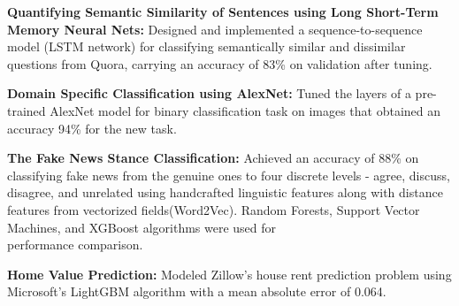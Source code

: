 \begin{cventries}
\vspace{-5mm}
  \cventry
    {}
    {}
    {}
    {}
    {
      \begin{cvitems}
      \item {{ \textbf{Quantifying Semantic Similarity of Sentences using Long Short-Term Memory Neural Nets:} Designed and implemented a sequence-to-sequence model (LSTM network) for classifying semantically similar and dissimilar questions from Quora, carrying an accuracy of 83\% on validation after tuning.}}
      \item {{\textbf{Domain Specific Classification using AlexNet:} Tuned the layers of a pre-trained AlexNet model for binary classification task on images that obtained an accuracy 94\% for the new task.}}
      \item { \textbf{The Fake News Stance Classification:} Achieved an accuracy of 88\% on classifying fake news from the genuine ones to four discrete levels - agree, discuss, disagree, and unrelated using handcrafted linguistic features along with distance features from vectorized fields(Word2Vec). Random Forests, Support Vector Machines, and XGBoost algorithms were used for \\ performance comparison.}
      \item { \textbf{Home Value Prediction:} Modeled Zillow's house rent prediction problem using Microsoft's LightGBM algorithm with a mean absolute error of 0.064.}
      \end{cvitems}
    }
\end{cventries}
